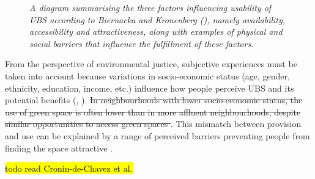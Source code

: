 \documentclass{article}
\begin{document}
\begin{figure}[h]
	\caption{\textit{A diagram summarising the three factors influencing usability of UBS according to Biernacka and Kronenberg (\citeyear{biernacka2018classification}), namely availability, accessibility and attractiveness, along with examples of physical and social barriers that influence the fulfillment of these factors.}}
	  \label{fig:diagram_ubs_use}
\end{figure}

From the perspective of environmental justice, subjective experiences must be taken into account because variations in socio-economic status (age, gender, ethnicity, education, income, etc.) influence how people perceive UBS and its potential benefits (\cite{plieninger2022disentangling}, \cite{phillips2021use}). \sout{In neighbourhoods with lower socio-economic status, the use of green space is often lower than in more affluent neighbourhoods, despite similar opportunities to access green spaces \parencite{wang2015comparison}}. This mismatch between provision and use can be explained by a range of perceived barriers preventing people from finding the space attractive \parencite{noel2021social}.


\hl{todo read Cronin-de-Chavez et al.}

\end{document}
